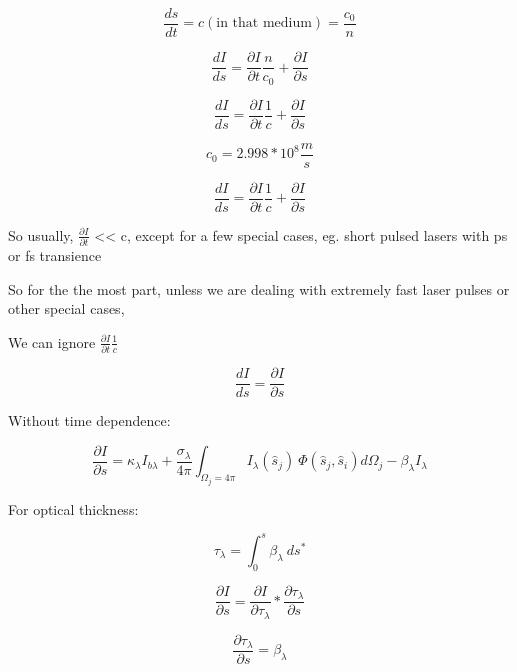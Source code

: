 \documentclass[12pt]{article}
\renewcommand{\_}{\kern-1.5pt\textunderscore\kern-1.5pt}
\begin{document}
\begin{itemize}
 \[ \frac{ds}{dt}=c  \left( \text{in that medium} \right) =\frac{c_{0}}{n} \] \par

 \[ \frac{dI}{ds}=\frac{ \partial I}{ \partial t}\frac{n}{c_{0}}+\frac{ \partial I}{ \partial s} \] \par

 \[ \frac{dI}{ds}=\frac{ \partial I}{ \partial t}\frac{1}{c} +\frac{ \partial I}{ \partial s} \] \par

 \[ c_{0}=2.998\ast10^{8}\frac{m}{s} \] \par

 \[ \frac{dI}{ds}=\frac{ \partial I}{ \partial t}\frac{1}{c} +\frac{ \partial I}{ \partial s} \] \par

So usually,  \( \frac{ \partial I}{ \partial t} \)  << c, except for a few special cases, eg. short pulsed lasers with ps or fs transience\par

So for the the most part, unless we are dealing with extremely fast laser pulses or other special cases,\par

We can ignore  \( \frac{ \partial I}{ \partial t}\frac{1}{c} \) \par

 \[ \frac{dI}{ds}=\frac{ \partial I}{ \partial s} \] \par

Without time dependence:\par

 \[ \frac{ \partial I}{ \partial s}= \kappa _{ \lambda }I_{b \lambda }+\frac{ \sigma _{ \lambda }}{4 \pi } \int _{ \Omega _{j}=4 \pi }^{}I_{ \lambda } \left( \hat{s}_{j} \right) ~ \Phi  \left( \hat{s}_{j},\hat{s}_{i} \right) d \Omega _{j}- \beta _{ \lambda }I_{ \lambda } \] \par

For optical thickness:\par

 \[  \tau_{ \lambda }= \int _{0}^{s} \beta _{ \lambda }~ds^{\ast} \] \par

 \[ \frac{ \partial I}{ \partial s}=\frac{ \partial I}{ \partial  \tau_{ \lambda }}\ast\frac{ \partial  \tau_{ \lambda }}{ \partial s} \] \par

 \[ \frac{ \partial  \tau_{ \lambda }}{ \partial s}= \beta _{ \lambda } \] \par


\end{itemize}
\end{document}
